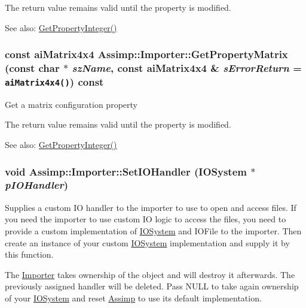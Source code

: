 The return value remains valid until the property is modified. \begin{Desc}
\item[See also:]\hyperlink{class_assimp_1_1_importer_3e796a0758a9f10f13107f44c542ad41}{GetPropertyInteger()} \end{Desc}
\hypertarget{class_assimp_1_1_importer_1b2e36eab7155233846b24ec30e7e273}{
\subsubsection[GetPropertyMatrix]{\setlength{\rightskip}{0pt plus 5cm}const aiMatrix4x4 Assimp::Importer::GetPropertyMatrix (const char $\ast$ {\em szName}, \/  const aiMatrix4x4 \& {\em sErrorReturn} = {\tt aiMatrix4x4()}) const}}
\label{class_assimp_1_1_importer_1b2e36eab7155233846b24ec30e7e273}


Get a matrix configuration property

The return value remains valid until the property is modified. \begin{Desc}
\item[See also:]\hyperlink{class_assimp_1_1_importer_3e796a0758a9f10f13107f44c542ad41}{GetPropertyInteger()} \end{Desc}
\hypertarget{class_assimp_1_1_importer_1161f46318af18bb86dfe0fc3edea4df}{
\subsubsection[SetIOHandler]{\setlength{\rightskip}{0pt plus 5cm}void Assimp::Importer::SetIOHandler ({\bf IOSystem} $\ast$ {\em pIOHandler})}}
\label{class_assimp_1_1_importer_1161f46318af18bb86dfe0fc3edea4df}


Supplies a custom IO handler to the importer to use to open and access files. If you need the importer to use custom IO logic to access the files, you need to provide a custom implementation of \hyperlink{class_assimp_1_1_i_o_system}{IOSystem} and IOFile to the importer. Then create an instance of your custom \hyperlink{class_assimp_1_1_i_o_system}{IOSystem} implementation and supply it by this function.

The \hyperlink{class_assimp_1_1_importer}{Importer} takes ownership of the object and will destroy it afterwards. The previously assigned handler will be deleted. Pass NULL to take again ownership of your \hyperlink{class_assimp_1_1_i_o_system}{IOSystem} and reset \hyperlink{namespace_assimp}{Assimp} to use its default implementation.

